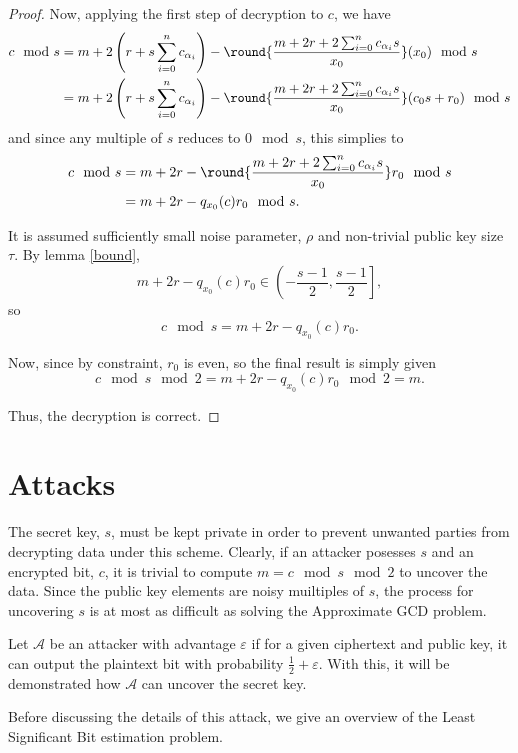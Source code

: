 \documentclass[a4paper,11pt, oneside]{article}
\begin{document}
\begin{proof}
Now, applying the first step of decryption to $c$, we have
    \begin{align*}
        c\mod{s} &= m + 2\left( r + s\sum_{i=0}^n c_{\alpha_i}\right) - \round{\frac{m + 2r + 2\sum_{i=0}^nc_{\alpha_i}s}{x_0}}(x_0)\mod{s}\\
                 &= m + 2\left( r + s\sum_{i=0}^n c_{\alpha_i}\right) - \round{\frac{m + 2r + 2\sum_{i=0}^nc_{\alpha_i}s}{x_0}}(c_0s+r_0)\mod{s}
    \end{align*}
    and since any multiple of $s$ reduces to $0\mod{s}$, this simplies to
    \begin{align*}
        c\mod{s} &= m + 2r - \round{\frac{m + 2r + 2\sum_{i=0}^nc_{\alpha_i}s}{x_0}}r_0\mod{s}\\
                 &= m + 2r - q_{x_0}(c)r_0\mod{s}.
    \end{align*}
    
    It is assumed sufficiently small noise parameter, $\rho$ and non-trivial public key size $\tau$.
    By lemma \ref{bound}, \[m+2r-q_{x_0}(c)r_0 \in \left(-\frac{s-1}{2}, \frac{s-1}{2}\right],\] 
    so 
    \[c\mod{s} = m + 2r - q_{x_0}(c)r_0.\]
    
    Now, since by constraint, $r_0$ is even, so the final result is simply given
    \[c\mod{s}\mod{2} = m + 2r - q_{x_0}(c)r_0\mod{2} = m. \]

    Thus, the decryption is correct.

\end{proof}



\section{Attacks}

The secret key, $s$, must be kept private in order to prevent unwanted parties from decrypting data under this scheme.  Clearly, if an attacker posesses $s$ and an encrypted bit, $c$, it is trivial to compute $m = c\mod{s}\mod{2}$ to uncover the data.  Since the public key elements are noisy muiltiples of $s$, the process for uncovering $s$ is at most as difficult as solving the Approximate GCD problem.

Let $\mathcal{A}$ be an attacker with advantage $\varepsilon$ if for a given ciphertext and public key, it can output the plaintext bit with probability $\frac{1}{2} + \varepsilon$.  With this, it will be demonstrated how $\mathcal{A}$ can uncover the secret key.

Before discussing the details of this attack, we give an overview of the Least Significant Bit estimation problem.
\end{document}
